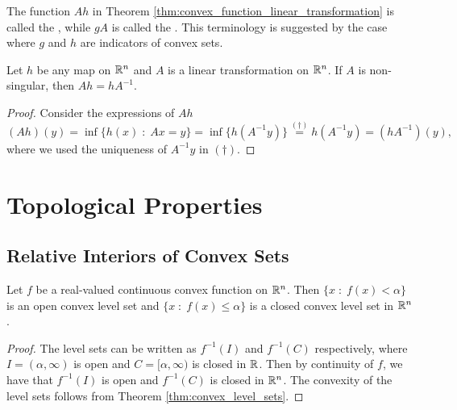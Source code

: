 \documentclass[11pt,a4paper]{article}
\begin{document}
\begin{remark}
    The function $Ah$ in Theorem \ref{thm:convex_function_linear_transformation} is called the , while $gA$ is called the . This terminology is suggested by the case where $g$ and $h$ are indicators of convex sets.
\end{remark}

\begin{proposition}
    Let $h$ be any map on $\mathbb{R}^n$ and $A$ is a linear transformation on $\mathbb{R}^n$. If $A$ is non-singular, then $Ah = hA^{-1}$.
\end{proposition}

\begin{proof}
    Consider the expressions of $Ah$ 
    \begin{equation*}
        (Ah)(y) = \inf\{h(x)\;:\;Ax = y\} = \inf \{h(A^{-1}y)\} \overset{(\dagger)}{=} h(A^{-1}y) = (hA^{-1})(y),
    \end{equation*}
    where we used the uniqueness of $A^{-1}y$ in $(\dagger)$.
\end{proof}

\newpage 

\section{Topological Properties}

\subsection{Relative Interiors of Convex Sets}

\begin{proposition}
    Let $f$ be a real-valued continuous convex function on $\mathbb{R}^n$. Then $\{x\;:\;f(x)<\alpha\}$ is an open convex level set and $\{x\;:\;f(x)\le \alpha\}$ is a closed convex level set in $\mathbb{R}^n$.
\end{proposition}

\begin{proof}
    The level sets can be written as $f^{-1}(I)$ and $f^{-1}(C)$ respectively, where $I = (\alpha,\infty)$ is open and $C = [\alpha,\infty)$ is closed in $\mathbb{R}$. Then by continuity of $f$, we have that $f^{-1}(I)$ is open and $f^{-1}(C)$ is closed in $\mathbb{R}^n$. The convexity of the level sets follows from Theorem \ref{thm:convex_level_sets}. 
\end{proof}
\end{document}
